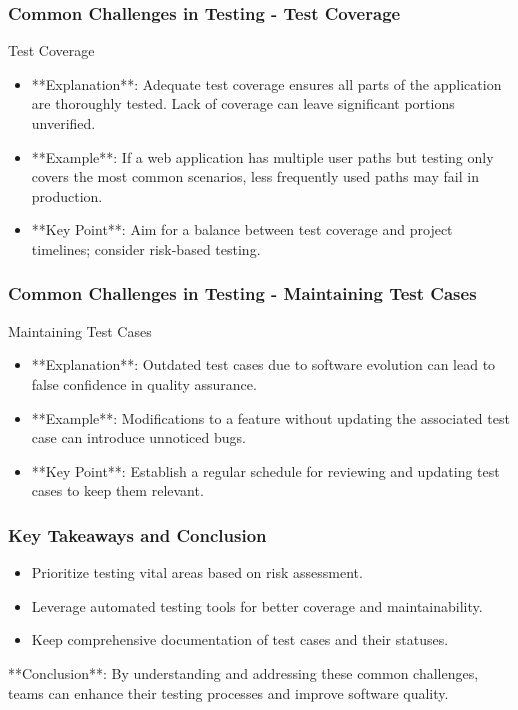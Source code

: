 \documentclass{beamer}
\begin{document}
\begin{frame}[fragile]
    \frametitle{Common Challenges in Testing - Test Coverage}
    \begin{block}{Test Coverage}
        \begin{itemize}
            \item **Explanation**: Adequate test coverage ensures all parts of the application are thoroughly tested. Lack of coverage can leave significant portions unverified.
            \item **Example**: If a web application has multiple user paths but testing only covers the most common scenarios, less frequently used paths may fail in production.
            \item **Key Point**: Aim for a balance between test coverage and project timelines; consider risk-based testing.
        \end{itemize}
    \end{block}
\end{frame}

\begin{frame}[fragile]
    \frametitle{Common Challenges in Testing - Maintaining Test Cases}
    \begin{block}{Maintaining Test Cases}
        \begin{itemize}
            \item **Explanation**: Outdated test cases due to software evolution can lead to false confidence in quality assurance.
            \item **Example**: Modifications to a feature without updating the associated test case can introduce unnoticed bugs.
            \item **Key Point**: Establish a regular schedule for reviewing and updating test cases to keep them relevant.
        \end{itemize}
    \end{block}
\end{frame}

\begin{frame}[fragile]
    \frametitle{Key Takeaways and Conclusion}
    \begin{itemize}
        \item Prioritize testing vital areas based on risk assessment.
        \item Leverage automated testing tools for better coverage and maintainability.
        \item Keep comprehensive documentation of test cases and their statuses.
    \end{itemize}
    
    **Conclusion**: By understanding and addressing these common challenges, teams can enhance their testing processes and improve software quality.
\end{frame}
\end{document}
